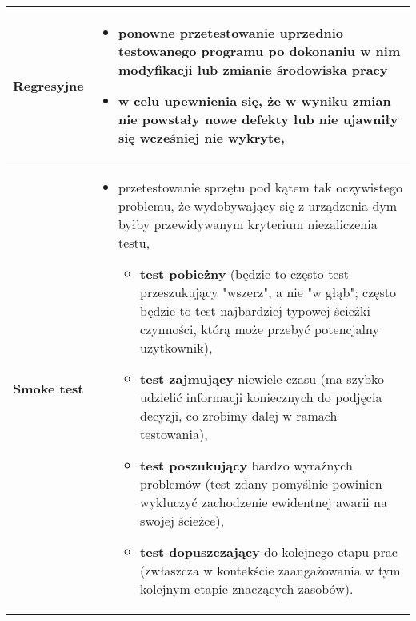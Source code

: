\documentclass[../main.tex]{subfiles}
\begin{document}
    \begin{table}[H]
        \begin{center}
            \begin{tabular}{ p{3cm} p{13cm} }
                \textbf{Regresyjne}
                &
                \begin{itemize}
                    \item ponowne przetestowanie uprzednio testowanego programu po dokonaniu w nim modyfikacji
                    lub zmianie środowiska pracy
                    \item w celu upewnienia
                    się, że w wyniku zmian nie powstały nowe defekty lub nie ujawniły się wcześniej nie wykryte,
                \end{itemize}
                \\

                \toprule

                \textbf{Smoke test}
                &
                \begin{itemize}
                    \item przetestowanie sprzętu pod kątem tak oczywistego problemu, że wydobywający się z urządzenia dym
                    byłby przewidywanym kryterium niezaliczenia testu,
                    \begin{itemize}
                        \item \textbf{test pobieżny} (będzie to często test przeszukujący "wszerz", a nie "w głąb"; często będzie to test najbardziej typowej ścieżki czynności, którą może przebyć potencjalny użytkownik),
                        \item \textbf{test zajmujący} niewiele czasu (ma szybko udzielić informacji koniecznych do podjęcia decyzji, co zrobimy dalej w ramach testowania),
                        \item \textbf{test poszukujący} bardzo wyraźnych problemów (test zdany pomyślnie powinien wykluczyć zachodzenie ewidentnej awarii na swojej ścieżce),
                        \item \textbf{test dopuszczający} do kolejnego etapu prac (zwłaszcza w kontekście zaangażowania w tym kolejnym etapie znaczących zasobów).
                    \end{itemize}
                \end{itemize}
                \\
            \end{tabular}
        \end{center}
    \end{table}
\end{document}
